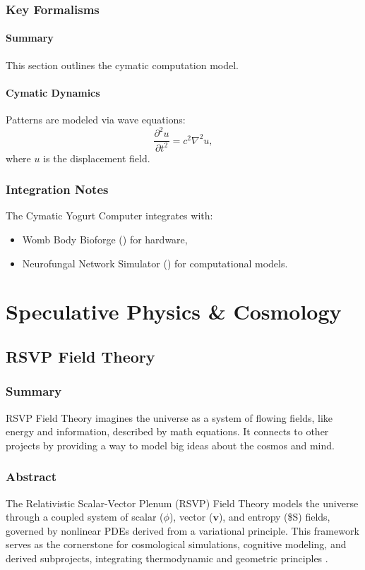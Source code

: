 \documentclass[11pt,oneside]{memoir}
\theoremstyle{plain}
\begin{document}
\section{Key Formalisms}
\subsection{Summary}
This section outlines the cymatic computation model.

\subsection{Cymatic Dynamics}
Patterns are modeled via wave equations:
\begin{equation}
    \frac{\partial^2 u}{\partial t^2} = c^2 \nabla^2 u,
\end{equation}
where \(u\) is the displacement field.

\section{Integration Notes}
The Cymatic Yogurt Computer integrates with:
\begin{itemize}
    \item Womb Body Bioforge () for hardware,
    \item Neurofungal Network Simulator () for computational models.
\end{itemize}

\part{Speculative Physics \& Cosmology}

\chapter{RSVP Field Theory}
\label{sec:rsvp_field}

\section{Summary}
RSVP Field Theory imagines the universe as a system of flowing fields, like energy and information, described by math equations. It connects to other projects by providing a way to model big ideas about the cosmos and mind.

\section{Abstract}
The Relativistic Scalar-Vector Plenum (RSVP) Field Theory models the universe through a coupled system of scalar (\(\phi\)), vector (\(\mathbf{v}\)), and entropy (\$S\)) fields, governed by nonlinear PDEs derived from a variational principle. This framework serves as the cornerstone for cosmological simulations, cognitive modeling, and derived subprojects, integrating thermodynamic and geometric principles \cite{evans}.
\end{document}
